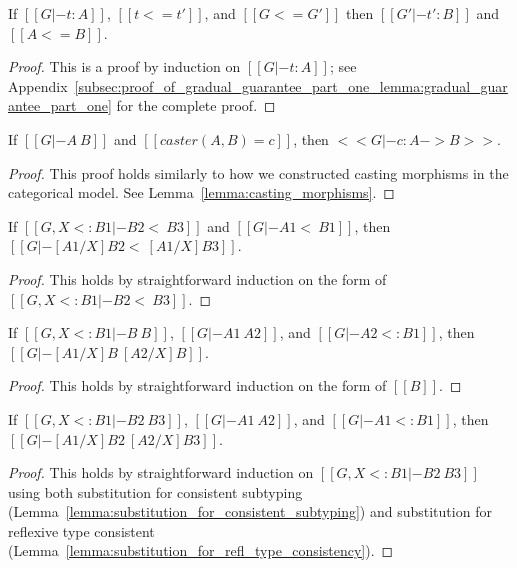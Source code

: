 \begin{lemma}
  \label{lemma:gradual_guarantee_part_one}
  If $[[G |- t : A]]$, $[[t <= t']]$, and $[[G <= G']]$ then $[[G' |- t' : B]]$ and $[[A <= B]]$.
\end{lemma}
\begin{proof}
  This is a proof by induction on $[[G |- t : A]]$; see
  Appendix~\ref{subsec:proof_of_gradual_guarantee_part_one_lemma:gradual_guarantee_part_one}
  for the complete proof.
\end{proof}

\begin{lemma}
  \label{lemma:typing_casting_morphisms}
  If $[[G |- A ~ B]]$ and $[[caster(A,B) = c]]$, then $<<G |- c : A -> B>>$.
\end{lemma}
\begin{proof}
  This proof holds similarly to how we constructed casting morphisms in the categorical
  model.  See Lemma~\ref{lemma:casting_morphisms}.
\end{proof}

\begin{lemma}
  \label{lemma:substitution_for_consistent_subtyping}
  If $[[G, X <: B1 |- B2 <~ B3]]$ and $[[G |- A1 <~ B1]]$, then $[[G |- [A1/X]B2 <~ [A1/X]B3]]$.
\end{lemma}
\begin{proof}
  This holds by straightforward induction on the form of $[[G, X <: B1 |- B2 <~ B3]]$.
\end{proof}

\begin{lemma}
  \label{lemma:substitution_for_refl_type_consistency}
  If $[[G, X <: B1 |- B ~ B]]$, $[[G |- A1 ~ A2]]$, and $[[G |- A2 <: B1]]$, then $[[G |- [A1/X]B ~ [A2/X]B]]$.
\end{lemma}
\begin{proof}
  This holds by straightforward induction on the form of $[[B]]$.
\end{proof}

\begin{lemma}
  \label{lemma:substitution_for_type_consistency}
  If $[[G, X <: B1 |- B2 ~ B3]]$, $[[G |- A1 ~ A2]]$, and $[[G |- A1 <: B1]]$, then $[[G |- [A1/X]B2 ~ [A2/X]B3]]$.
\end{lemma}
\begin{proof}
  This holds by straightforward induction on $[[G, X <: B1 |- B2 ~
      B3]]$ using both substitution for consistent subtyping
  (Lemma~\ref{lemma:substitution_for_consistent_subtyping}) and
  substitution for reflexive type consistent
  (Lemma~\ref{lemma:substitution_for_refl_type_consistency}).
  
\end{proof}

